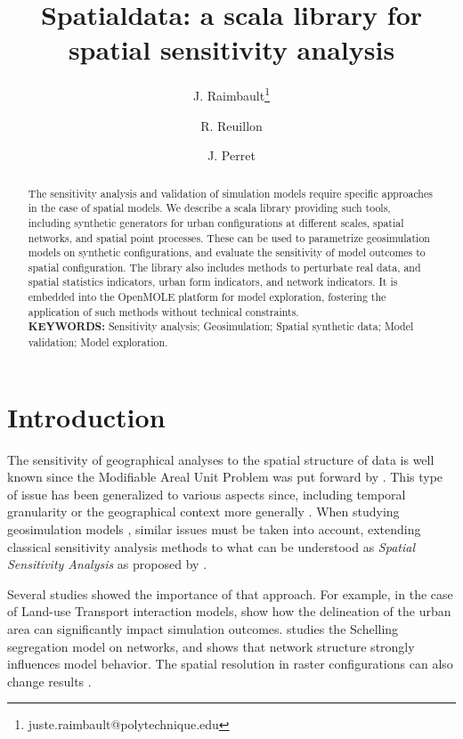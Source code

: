 \documentclass[11pt]{article}
\title{Spatialdata: a scala library for spatial sensitivity analysis}
\author[1,2,3]{J. Raimbault\thanks{juste.raimbault@polytechnique.edu}}
\author[2]{R. Reuillon}
\author[4,2]{J. Perret}
\affil[1]{Center for Advanced Spatial Analysis, University College London}
\affil[2]{UPS CNRS 3611 ISC-PIF}
\affil[3]{UMR CNRS 8504 G{\'e}ographie-cit{\'e}s}
\affil[4]{LaSTIG STRUDEL, IGN, ENSG, Univ. Paris-Est}
\date{}
\begin{document}
\maketitle


\begin{abstract}
The sensitivity analysis and validation of simulation models require specific approaches in the case of spatial models. We describe a scala library providing such tools, including synthetic generators for urban configurations at different scales, spatial networks, and spatial point processes. These can be used to parametrize geosimulation models on synthetic configurations, and evaluate the sensitivity of model outcomes to spatial configuration. The library also includes methods to perturbate real data, and spatial statistics indicators, urban form indicators, and network indicators. It is embedded into the OpenMOLE platform for model exploration, fostering the application of such methods without technical constraints.
\medskip\\ {\bf KEYWORDS:} Sensitivity analysis; Geosimulation; Spatial synthetic data; Model validation; Model exploration.

\end{abstract}


\section{Introduction}


The sensitivity of geographical analyses to the spatial structure of data is well known since the Modifiable Areal Unit Problem was put forward by \cite{openshaw1984modifiable}. This type of issue has been generalized to various aspects since, including temporal granularity \citep{cheng2014modifiable} or the geographical context more generally \citep{kwan2012uncertain}. When studying geosimulation models \citep{benenson2004geosimulation}, similar issues must be taken into account, extending classical sensitivity analysis methods \citep{saltelli2004sensitivity} to what can be understood as \emph{Spatial Sensitivity Analysis} as proposed by \cite{raimbault2019space}.

Several studies showed the importance of that approach. For example, in the case of Land-use Transport interaction models, \cite{thomas2018city} show how the delineation of the urban area can significantly impact simulation outcomes. \cite{banos2012network} studies the Schelling segregation model on networks, and shows that network structure strongly influences model behavior. The spatial resolution in raster configurations can also change results \citep{singh2007schelling}.
\end{document}
